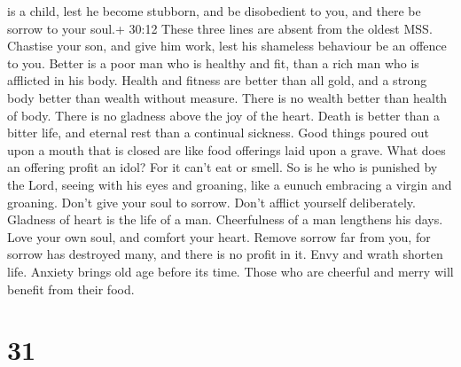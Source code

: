 is a child, lest he become stubborn, and be disobedient to you, and
there be sorrow to your soul.+ 30:12 These three lines are absent from
the oldest MSS.  Chastise your son, and give him work, lest
his shameless behaviour be an offence to you.  Better is a
poor man who is healthy and fit, than a rich man who is afflicted in his
body.  Health and fitness are better than all gold, and a
strong body better than wealth without measure.  There is
no wealth better than health of body. There is no gladness above the joy
of the heart.  Death is better than a bitter life, and
eternal rest than a continual sickness.  Good things poured
out upon a mouth that is closed are like food offerings laid upon a
grave.  What does an offering profit an idol? For it can't
eat or smell. So is he who is punished by the Lord,  seeing
with his eyes and groaning, like a eunuch embracing a virgin and
groaning.  Don't give your soul to sorrow. Don't afflict
yourself deliberately.  Gladness of heart is the life of a
man. Cheerfulness of a man lengthens his days.  Love your
own soul, and comfort your heart. Remove sorrow far from you, for sorrow
has destroyed many, and there is no profit in it.  Envy and
wrath shorten life. Anxiety brings old age before its time.
 Those who are cheerful and merry will benefit from their
food.

\hypertarget{section-9}{%
\section{31}\label{section-9}}

